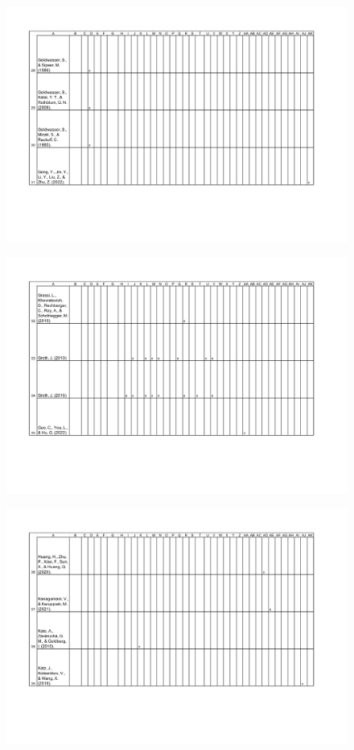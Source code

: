 \begin{figure}[H]
	\centering
		\includegraphics[width=1.0\textwidth]{Pictures/concept_matrix/wos-08.png}
\end{figure}

\begin{figure}[H]
	\centering
		\includegraphics[width=1.0\textwidth]{Pictures/concept_matrix/wos-09.png}
\end{figure}

\begin{figure}[H]
	\centering
		\includegraphics[width=1.0\textwidth]{Pictures/concept_matrix/wos-10.png}
\end{figure}

